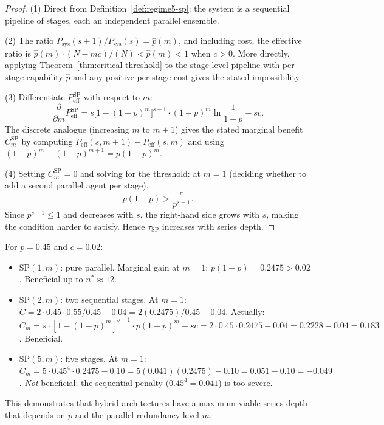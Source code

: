 \begin{proof}
(1) Direct from Definition~\ref{def:regime5-sp}: the system is a sequential pipeline
of stages, each an independent parallel ensemble.

(2) The ratio $P_{\mathrm{sys}}(s+1)/P_{\mathrm{sys}}(s) = \hat{p}(m)$, and
including cost, the effective ratio is $\hat{p}(m) \cdot (N-mc)/(N) < \hat{p}(m) < 1$
when $c > 0$. More directly, applying Theorem~\ref{thm:critical-threshold} to the
stage-level pipeline with per-stage capability $\hat{p}$ and any positive per-stage
cost gives the stated impossibility.

(3) Differentiate $P_{\mathrm{eff}}^{\mathrm{SP}}$ with respect to $m$:
\[
  \frac{\partial}{\partial m} P_{\mathrm{eff}}^{\mathrm{SP}}
  = s\bigl[1-(1-p)^m\bigr]^{s-1} \cdot (1-p)^m \ln\frac{1}{1-p} - sc.
\]
The discrete analogue (increasing $m$ to $m+1$) gives the stated marginal benefit
$C^{\mathrm{SP}}_m$ by computing $P_{\mathrm{eff}}(s, m+1) - P_{\mathrm{eff}}(s, m)$
and using $(1-p)^m - (1-p)^{m+1} = p(1-p)^m$.

(4) Setting $C^{\mathrm{SP}}_m = 0$ and solving for the threshold: at $m = 1$
(deciding whether to add a second parallel agent per stage),
\[
  p(1-p) > \frac{c}{p^{s-1}}.
\]
Since $p^{s-1} \leq 1$ and decreases with $s$, the right-hand side grows with $s$,
making the condition harder to satisfy. Hence $\tau_{\mathrm{SP}}$ increases with
series depth.
\end{proof}

\begin{example}[Hybrid Saturation at $p = 0.45$]
For $p = 0.45$ and $c = 0.02$:
\begin{itemize}
  \item $\mathrm{SP}(1, m)$: pure parallel. Marginal gain at $m = 1$:
    $p(1-p) = 0.2475 > 0.02$. Beneficial up to $n^* \approx 12$.
  \item $\mathrm{SP}(2, m)$: two sequential stages. At $m = 1$:
    $C = 2 \cdot 0.45 \cdot 0.55 / 0.45 - 0.04 = 2(0.2475)/0.45 - 0.04$.
    Actually: $C_m = s \cdot [1-(1-p)^m]^{s-1} \cdot p(1-p)^m - sc
    = 2 \cdot 0.45 \cdot 0.2475 - 0.04 = 0.2228 - 0.04 = 0.183$. Beneficial.
  \item $\mathrm{SP}(5, m)$: five stages. At $m = 1$:
    $C_m = 5 \cdot 0.45^4 \cdot 0.2475 - 0.10 = 5(0.041)(0.2475) - 0.10 =
    0.051 - 0.10 = -0.049$. \emph{Not} beneficial: the sequential penalty
    ($0.45^4 = 0.041$) is too severe.
\end{itemize}
This demonstrates that hybrid architectures have a maximum viable series depth
that depends on $p$ and the parallel redundancy level $m$.
\end{example}

